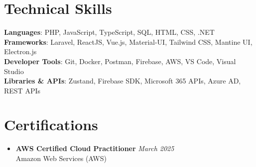 \documentclass[letterpaper,11pt]{article}
\begin{document}
\section{Technical Skills}
 \begin{itemize}[leftmargin=0.15in, label={}]
    \small{\item{
     \textbf{Languages}{: PHP, JavaScript, TypeScript, SQL, HTML, CSS, .NET} \\
     \textbf{Frameworks}{: Laravel, ReactJS, Vue.js, Material-UI, Tailwind CSS, Mantine UI, Electron.js} \\
     \textbf{Developer Tools}{: Git, Docker, Postman, Firebase, AWS, VS Code, Visual Studio} \\
     \textbf{Libraries \& APIs}{: Zustand, Firebase SDK, Microsoft 365 APIs, Azure AD, REST APIs}
    }}
 \end{itemize}

\section{Certifications}
 \begin{itemize}[leftmargin=0.15in, label={}]
   \item{
     \textbf{AWS Certified Cloud Practitioner} \hfill \emph{March 2025} \\
     Amazon Web Services (AWS)
   }
 \end{itemize}
\end{document}
